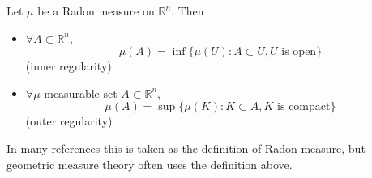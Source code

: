     \begin{theorem}
        Let $\mu$ be a Radon measure on $\mathbb{R}^{n}$. Then
        \begin{itemize}
            \item[(i)] $\forall A\subset \mathbb{R}^{n}$, 
            \begin{equation}
                \mu(A)= \operatorname{inf}\{ \mu(U):A\subset U, U\text{ is open} \}
                \label{eq:radon-inner}
            \end{equation}
            (inner regularity)
            \item[(ii)] $\forall \mu$-measurable set $A\subset \mathbb{R}^{n}$, 
            \[
                \mu(A)=\operatorname{sup}\{ \mu(K):K\subset A,K\text{ is compact} \}
            \]
            (outer regularity)
        \end{itemize}
    \end{theorem}

    \begin{remark}
        In many references this is taken as the definition of Radon measure, but geometric measure theory often uses the definition above.
    \end{remark}

